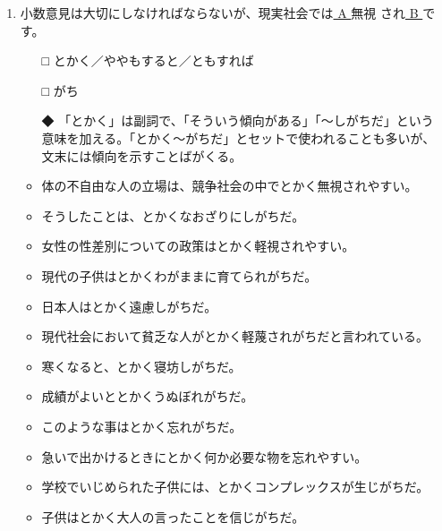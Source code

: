 \documentclass[
uplatex,
b5paper,
10pt,
dvipdfmx
]{jsbook}
\begin{document}
\begin{enumerate}
\item 小数意見は大切にしなければならないが、現実社会では\underline{ A  }無視
      され\underline{ B }です。
\begin{itemize}
\item[□] とかく／ややもすると／ともすれば
\item[□] がち
\item[◆] 「とかく」は副詞で、「そういう傾向がある」「〜しがちだ」という
	  意味を加える。「とかく〜がちだ」とセットで使われることも多いが、
	  文末には傾向を示すことばがくる。
\end{itemize}
\begin{itemize}
\item 体の不自由な人の立場は、競争社会の中でとかく無視されやすい。
\item そうしたことは、とかくなおざりにしがちだ。
\item 女性の性差別についての政策はとかく軽視されやすい。
\item 現代の子供はとかくわがままに育てられがちだ。
\item 日本人はとかく遠慮しがちだ。
\item 現代社会において貧乏な人がとかく軽蔑されがちだと言われている。
\item 寒くなると、とかく寝坊しがちだ。
\item 成績がよいととかくうぬぼれがちだ。
\item このような事はとかく忘れがちだ。
\item 急いで出かけるときにとかく何か必要な物を忘れやすい。
\item 学校でいじめられた子供には、とかくコンプレックスが生じがちだ。
\item 子供はとかく大人の言ったことを信じがちだ。
\end{itemize}


\end{enumerate}
\end{document}
